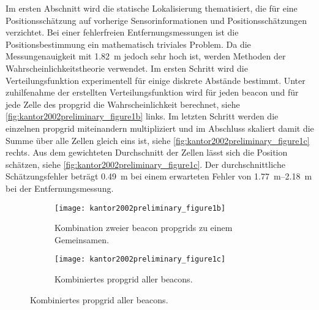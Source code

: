 Im ersten Abschnitt wird die statische Lokalisierung thematisiert, die für eine Positionsschätzung auf vorherige Sensorinformationen und Positionsschätzungen verzichtet. Bei einer fehlerfreien Entfernungsmessungen ist die Positionsbestimmung ein mathematisch triviales Problem. Da die Messungenauigkeit mit \SI{1.82}{\metre} jedoch sehr hoch ist, werden Methoden der Wahrscheinlichkeitstheorie verwendet. Im ersten Schritt wird die Verteilungsfunktion experimentell für einige diskrete Abstände bestimmt. Unter zuhilfenahme der erstellten Verteilungsfunktion wird für jeden \Gls{beacon} und für jede Zelle des \Gls{propgrid} die Wahrscheinlichkeit berechnet, siehe \autoref{fig:kantor2002preliminary_figure1b} links. Im letzten Schritt werden die einzelnen \Gls{propgrid} miteinandern multipliziert und im Abschluss skaliert damit die Summe über alle Zellen gleich eins ist, siehe \autoref{fig:kantor2002preliminary_figure1c} rechts. Aus dem gewichteten Durchschnitt der Zellen lässt sich die Position schätzen, siehe \autoref{fig:kantor2002preliminary_figure1c}. Der durchschnittliche Schätzungsfehler beträgt \SI{0.49}{\metre} bei einem erwarteten Fehler von \SIrange{1,77}{2,18}{\metre} bei der Entfernungsmessung.


\begin{figure}
  \begin{subfigure}[t]{0.45\linewidth}
    \centering
    \texttt{[image: kantor2002preliminary\_figure1b]}
    \caption{Kombination zweier \Gls{beacon} \Glspl{propgrid} zu einem Gemeinsamen.}
    \label{fig:kantor2002preliminary_figure1b}
  \end{subfigure}
  \hfill
  \begin{subfigure}[t]{0.45\linewidth}
    \centering
    \texttt{[image: kantor2002preliminary\_figure1c]}
    \caption{Kombiniertes \Gls{propgrid} aller \Glspl{beacon}.}
    \label{fig:kantor2002preliminary_figure1c}
  \end{subfigure}
\end{figure}

